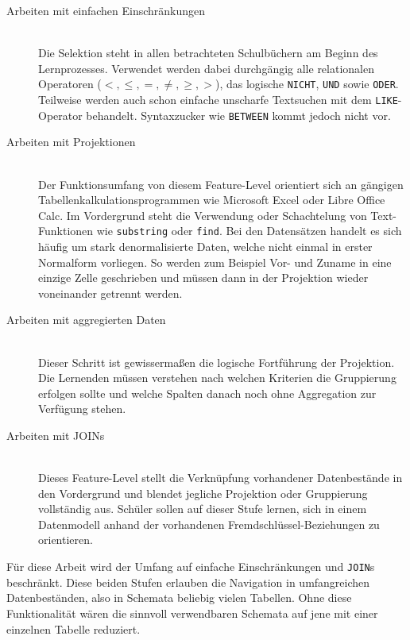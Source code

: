 \begin{description}
\item[Arbeiten mit einfachen Einschränkungen] \hfill \\
  Die Selektion steht in allen betrachteten Schulbüchern am Beginn des Lernprozesses. Verwendet werden dabei durchgängig alle relationalen Operatoren ($<, \leq, =, \neq, \geq, >$), das logische \lstinline{NICHT}, \lstinline{UND} sowie \lstinline{ODER}. Teilweise werden auch schon einfache unscharfe Textsuchen mit dem \lstinline{LIKE}-Operator behandelt. Syntaxzucker wie \lstinline{BETWEEN} kommt jedoch nicht vor.

\item[Arbeiten mit Projektionen] \hfill \\
  Der Funktionsumfang von diesem Feature-Level orientiert sich an gängigen Tabellenkalkulationsprogrammen wie Microsoft Excel oder Libre Office Calc. Im Vordergrund steht die Verwendung oder Schachtelung von Text-Funktionen wie \lstinline{substring} oder \lstinline{find}. Bei den Datensätzen handelt es sich häufig um stark denormalisierte Daten, welche nicht einmal in erster Normalform vorliegen. So werden zum Beispiel Vor- und Zuname in eine einzige Zelle geschrieben und müssen dann in der Projektion wieder voneinander getrennt werden.

\item[Arbeiten mit aggregierten Daten] \hfill \\
  Dieser Schritt ist gewissermaßen die logische Fortführung der Projektion. Die Lernenden müssen verstehen nach welchen Kriterien die Gruppierung erfolgen sollte und welche Spalten danach noch ohne Aggregation zur Verfügung stehen.

\item[Arbeiten mit JOINs] \hfill \\
  Dieses Feature-Level stellt die Verknüpfung vorhandener Datenbestände in den Vordergrund und blendet jegliche Projektion oder Gruppierung vollständig aus. Schüler sollen auf dieser Stufe lernen, sich in einem Datenmodell anhand der vorhandenen Fremdschlüssel-Beziehungen zu orientieren.
\end{description}

Für diese Arbeit wird der Umfang auf einfache Einschränkungen und \texttt{JOIN}s beschränkt. Diese beiden Stufen erlauben die Navigation in umfangreichen Datenbeständen, also in Schemata beliebig vielen Tabellen. Ohne diese Funktionalität wären die sinnvoll verwendbaren Schemata auf jene mit einer einzelnen Tabelle reduziert.

